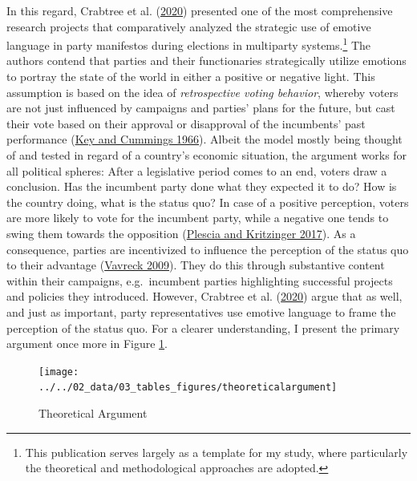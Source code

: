 \documentclass[a4paper,11pt]{article}
\begin{document}
In this regard, Crabtree et al. (\protect\hyperlink{ref-crabtreeItNotOnly2020}{2020}) presented one of the most comprehensive research projects that comparatively analyzed the strategic use of emotive language in party manifestos during elections in multiparty systems.\footnote{This publication serves largely as a template for my study, where particularly the theoretical and methodological approaches are adopted.}
The authors contend that parties and their functionaries strategically utilize emotions to portray the state of the world in either a positive or negative light. This assumption is based on the idea of \emph{retrospective voting behavior}, whereby voters are not just influenced by campaigns and parties' plans for the future, but cast their vote based on their approval or disapproval of the incumbents' past performance (\protect\hyperlink{ref-keyResponsibleElectorateRationality1966}{Key and Cummings 1966}). Albeit the model mostly being thought of and tested in regard of a country's economic situation, the argument works for all political spheres: After a legislative period comes to an end, voters draw a conclusion. Has the incumbent party done what they expected it to do? How is the country doing, what is the status quo? In case of a positive perception, voters are more likely to vote for the incumbent party, while a negative one tends to swing them towards the opposition (\protect\hyperlink{ref-plesciaRetrospectiveVotingParty2017}{Plescia and Kritzinger 2017}). As a consequence, parties are incentivized to influence the perception of the status quo to their advantage (\protect\hyperlink{ref-vavreckMessageMattersEconomy2009}{Vavreck 2009}). They do this through substantive content within their campaigns, e.g.~incumbent parties highlighting successful projects and policies they introduced. However, Crabtree et al. (\protect\hyperlink{ref-crabtreeItNotOnly2020}{2020}) argue that as well, and just as important, party representatives use emotive language to frame the perception of the status quo. For a clearer understanding, I present the primary argument once more in Figure \texttt{\ref{fig:theory}}.
\begin{figure}[H]

{\centering \texttt{[image: ../../02\_data/03\_tables\_figures/theoreticalargument]} 

}

\caption{Theoretical Argument}\label{fig:theory}
\end{figure}
\vspace{-.5cm}
\end{document}
